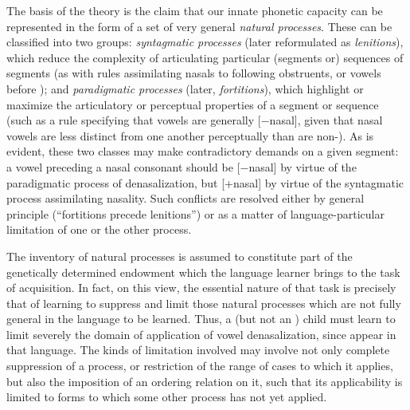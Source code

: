 The basis of the theory is the claim that our innate phonetic capacity
can be represented in the form of a set of very general
\textit{natural processes}. These can be classified into two groups:
\textit{syntagmatic processes} (later reformulated as
\emph{lenitions}), which reduce the complexity of articulating
particular (segments or) sequences of segments (as with rules
assimilating nasals to following obstruents, or  vowels
before ); and \textit{paradigmatic processes} (later,
\emph{fortitions}), which highlight or maximize the articulatory or
perceptual properties of a segment or sequence (such as a rule
specifying that vowels are generally [$-$nasal], given that nasal
vowels are less distinct from one another perceptually than are
non-). As is evident, these two classes may make
contradictory demands on a given segment: a vowel preceding a nasal
consonant should be [$-$nasal] by virtue of the paradigmatic process
of denasalization, but [+nasal] by virtue of the syntagmatic process
assimilating nasality. Such conflicts are resolved either by general
principle (``fortitions precede lenitions'') or as a matter of
language-particular limitation of one or the other process.

The inventory of natural processes is assumed to constitute part of
the genetically determined endowment which the language learner brings
to the task of acquisition. In fact, on this view, the essential
nature of that task is precisely that of learning to suppress and
limit those natural processes which are not fully general in the
language to be learned. Thus, a  (but not an ) child must
learn to limit severely the domain of application of vowel
denasalization, since  appear in that language. The kinds
of limitation involved may involve not only complete suppression of a
process, or restriction of the range of cases to which it applies, but
also the imposition of an ordering relation on it, such that its
applicability is limited to forms to which some other process has not
yet applied.

